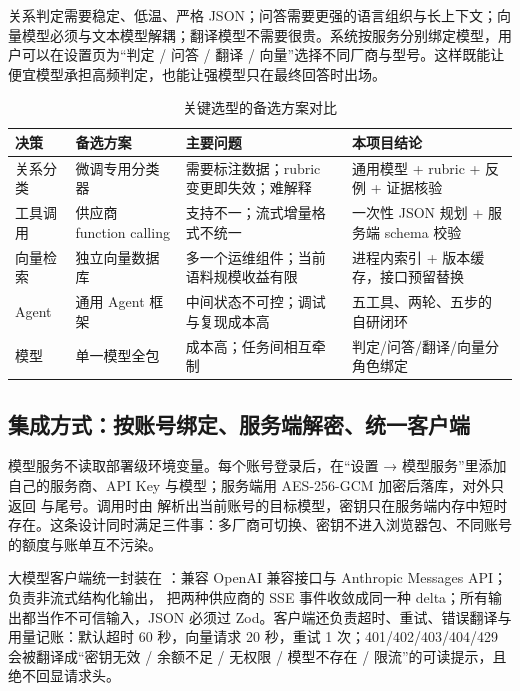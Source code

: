 关系判定需要稳定、低温、严格 JSON；问答需要更强的语言组织与长上下文；向量模型必须与文本模型解耦；翻译模型不需要很贵。系统按服务分别绑定模型，用户可以在设置页为“判定 / 问答 / 翻译 / 向量”选择不同厂商与型号。这样既能让便宜模型承担高频判定，也能让强模型只在最终回答时出场。

\begin{table}[htbp]
  \centering
  \small
  \caption{关键选型的备选方案对比}
  \label{tab:ai-choice}
  \begin{tabularx}{\textwidth}{L{3.0cm}L{4.6cm}L{4.2cm}Y}
    \toprule
\textbf{决策} & \textbf{备选方案} & \textbf{主要问题} & \textbf{本项目结论} \\
    \midrule
    关系分类 & 微调专用分类器 & 需要标注数据；rubric 变更即失效；难解释 & 通用模型 + rubric + 反例 + 证据核验 \\
    工具调用 & 供应商 function calling & 支持不一；流式增量格式不统一 & 一次性 JSON 规划 + 服务端 schema 校验 \\
    向量检索 & 独立向量数据库 & 多一个运维组件；当前语料规模收益有限 & 进程内索引 + 版本缓存，接口预留替换 \\
    Agent & 通用 Agent 框架 & 中间状态不可控；调试与复现成本高 & 五工具、两轮、五步的自研闭环 \\
    模型 & 单一模型全包 & 成本高；任务间相互牵制 & 判定/问答/翻译/向量分角色绑定 \\
    \bottomrule
  \end{tabularx}
\end{table}

\subsection{集成方式：按账号绑定、服务端解密、统一客户端}

模型服务不读取部署级环境变量。每个账号登录后，在“设置 → 模型服务”里添加自己的服务商、API Key 与模型；服务端用 AES-256-GCM 加密后落库，对外只返回  与尾号。调用时由  解析出当前账号的目标模型，密钥只在服务端内存中短时存在。这条设计同时满足三件事：多厂商可切换、密钥不进入浏览器包、不同账号的额度与账单互不污染。

大模型客户端统一封装在 ：兼容 OpenAI 兼容接口与 Anthropic Messages API； 负责非流式结构化输出， 把两种供应商的 SSE 事件收敛成同一种 delta；所有输出都当作不可信输入，JSON 必须过 Zod。客户端还负责超时、重试、错误翻译与用量记账：默认超时 60 秒，向量请求 20 秒，重试 1 次；401/402/403/404/429 会被翻译成“密钥无效 / 余额不足 / 无权限 / 模型不存在 / 限流”的可读提示，且绝不回显请求头。

